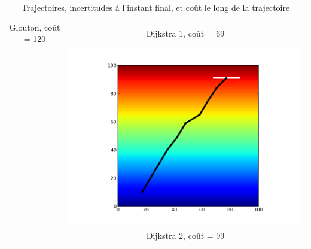 \begin{table}
\begin{tabular}{cc}
Glouton, coût = 120 &Dijkstra 1, coût = 69 \\
&\includegraphics[scale=0.42]{../data/gradient_dijkstra_plane_2/plot_A_10_17_B_91_77_iteration_009.png} \\
&Dijkstra 2, coût = 99\\
\end{tabular}
\caption{Trajectoires, incertitudes à l'instant final, et coût le long de la trajectoire}
\label{tab_plane}
\end{table}
